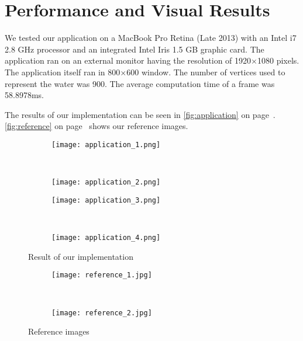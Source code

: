 \section{Performance and Visual Results}\label{sec:performance_visual_results}


We tested our application on a MacBook Pro Retina (Late 2013) with an Intel i7
2.8 GHz processor and an integrated Intel Iris 1.5 GB graphic card. The
application ran on an external monitor having the resolution of 1920$\times$1080
pixels. The application itself ran in 800$\times$600 window. The number of
vertices used to represent the water was 900. The average computation time of a
frame was 58.8978ms.

The results of our implementation can be seen in \autoref{fig:application} on
page~\pageref{fig:application}.  \autoref{fig:reference} on
page~\pageref{fig:reference} shows our reference images.

\begin{figure}[htb!]
    \centering
    \begin{subfigure}[htb!]{\textwidth}
        \centering
        \texttt{[image: application\_1.png]}\label{fig:application_1}
    \end{subfigure}\\
    \begin{subfigure}[htb!]{\textwidth}
        \centering
        \texttt{[image: application\_2.png]}\label{fig:application_2}
    \end{subfigure}
\end{figure}
\begin{figure}[htb!]\ContinuedFloat{}
    \centering
    \begin{subfigure}[htb!]{\textwidth}
        \centering
        \texttt{[image: application\_3.png]}\label{fig:application_3}
    \end{subfigure}\\
    \begin{subfigure}[htb!]{\textwidth}
        \centering
        \texttt{[image: application\_4.png]}\label{fig:application_4}
    \end{subfigure}
    \caption{Result of our implementation}\label{fig:application}
\end{figure}


\begin{figure}[htb!]
    \centering
    \begin{subfigure}[htb!]{\textwidth}
        \centering
        \texttt{[image: reference\_1.jpg]}\label{fig:reference_1}
    \end{subfigure}\\
    \begin{subfigure}[htb!]{\textwidth}
        \centering
        \texttt{[image: reference\_2.jpg]}\label{fig:reference_2}
    \end{subfigure}
    \caption{Reference images}\label{fig:reference}
\end{figure}

